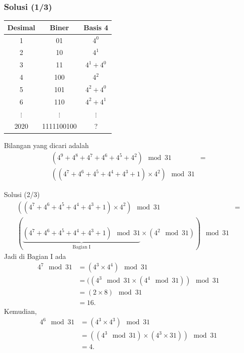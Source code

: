 \documentclass[english,t]{beamer}
\begin{document}
\begin{frame}
  \frametitle{Solusi (1/3)}

\begin{table}[!ht]
	\centering
	\begin{tabular}{|c|c|c|}
		\hline
		\multicolumn{1}{|c}{\textbf{Desimal}} & \multicolumn{1}{|c|}{\textbf{Biner}} & \multicolumn{1}{c|}{\textbf{Basis 4}} \\
		\hline
		1 & 01 & $4^0$ \\
		\hline
		2 & 10 & $4^1$ \\
		\hline
		3 & 11 & $4^1 + 4^0$ \\
		\hline 
		4 & 100 & $4^2$ \\
		\hline
		5 & 101 & $4^2 + 4^0$ \\
		\hline
		6 & 110 & $4^2 + 4^1$ \\
		\hline 
		$\vdots$ & $\vdots$ & $\vdots$ \\
		\hline
		2020 & 1111100100 & ? \\
		\hline
	\end{tabular}	
\end{table}
Bilangan yang dicari adalah
\begin{align*}
	(4^9 + 4^8 + 4^7 + 4^6 + 4^5 + 4^2) \mod 31 &= \\
	((4^7 + 4^6 + 4^5 +4^4 +4^3 + 1) \times 4^2 ) \mod 31 &
\end{align*}
\end{frame}

\begin{frame}{Solusi (2/3)}
	\begin{align*}
			((4^7 + 4^6 + 4^5 +4^4 +4^3 + 1) \times 4^2 )  \mod  31 &= \\
			        (\underbrace{(4^7 + 4^6 + 4^5 +4^4 +4^3 + 1) \mod 31}_{\text{Bagian I}}  \times (4^2  \mod 31) ) \mod  31 &
	\end{align*}
	Jadi di Bagian I ada 
	\begin{align*}
		4^7 \mod 31 &= (4^3 \times 4^4) \mod 31 \\
		                   &= ( (4^3 \mod 31 \times (4^4 \mod 31)) \mod 31 \\
		                   &= (2 \times 8) \mod 31 \\
		                   &= 16.
	\end{align*}
	Kemudian,
	\begin{align*}
		4^6 \mod 31 &= (4^3 \times 4^3) \mod 31 \\
		            &= ( (4^3 \mod 31) \times (4^3 \times 31) ) \mod 31 \\
		            &= 4. \\
	\end{align*}
\end{frame}
\end{document}
